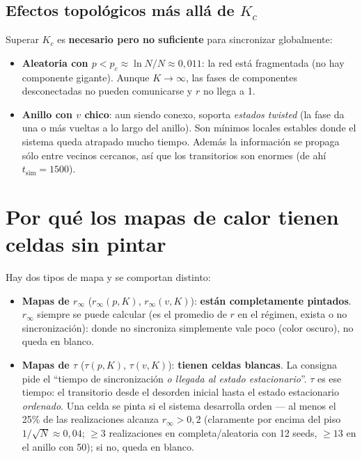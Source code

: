\documentclass[11pt,a4paper]{article}
\begin{document}
\subsection*{Efectos topológicos más allá de $K_c$}

Superar $K_c$ es \textbf{necesario pero no suficiente} para sincronizar
globalmente:
\begin{itemize}
  \item \textbf{Aleatoria con $p < p_c \approx \ln N / N \approx 0{,}011$}: la red
  está fragmentada (no hay componente gigante). Aunque $K \to \infty$, las fases
  de componentes desconectadas no pueden comunicarse y $r$ no llega a 1.
  \item \textbf{Anillo con $v$ chico}: aun siendo conexo, soporta \emph{estados
  twisted} (la fase da una o más vueltas a lo largo del anillo). Son mínimos
  locales estables donde el sistema queda atrapado mucho tiempo. Además la
  información se propaga sólo entre vecinos cercanos, así que los transitorios
  son enormes (de ahí $t_{\text{sim}} = 1500$).
\end{itemize}

\section{Por qué los mapas de calor tienen celdas sin pintar}

Hay dos tipos de mapa y se comportan distinto:

\begin{itemize}
  \item \textbf{Mapas de $r_\infty$} ($r_\infty(p,K)$, $r_\infty(v,K)$):
  \textbf{están completamente pintados}. $r_\infty$ siempre se puede calcular
  (es el promedio de $r$ en el régimen, exista o no sincronización): donde no
  sincroniza simplemente vale poco (color oscuro), no queda en blanco.

  \item \textbf{Mapas de $\tau$} ($\tau(p,K)$, $\tau(v,K)$): \textbf{tienen celdas
  blancas}. La consigna pide el ``tiempo de sincronización \emph{o llegada al
  estado estacionario}''. $\tau$ es ese tiempo: el transitorio desde el desorden
  inicial hasta el estado estacionario \emph{ordenado}. Una celda se pinta si el
  sistema desarrolla orden --- al menos el 25\% de las realizaciones alcanza
  $r_\infty > 0{,}2$ (claramente por encima del piso $1/\sqrt N \approx 0{,}04$;
  $\ge 3$ realizaciones en completa/aleatoria con 12 seeds, $\ge 13$ en el anillo
  con 50); si no, queda en blanco.
\end{itemize}
\end{document}
